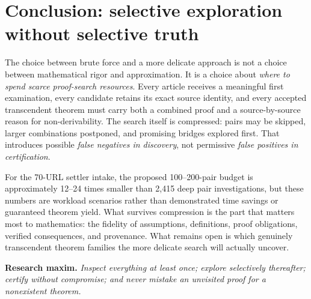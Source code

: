 \documentclass[11pt,letterpaper]{article}
\begin{document}
\section{Conclusion: selective exploration without selective truth}
The choice between brute force and a more delicate approach is not a choice between mathematical rigor and approximation. It is a choice about \emph{where to spend scarce proof-search resources}. Every article receives a meaningful first examination, every candidate retains its exact source identity, and every accepted transcendent theorem must carry both a combined proof and a source-by-source reason for non-derivability. The search itself is compressed: pairs may be skipped, larger combinations postponed, and promising bridges explored first. That introduces possible \emph{false negatives in discovery}, not permissive \emph{false positives in certification}.

For the 70-URL settler intake, the proposed 100--200-pair budget is approximately 12--24 times smaller than 2,415 deep pair investigations, but these numbers are workload scenarios rather than demonstrated time savings or guaranteed theorem yield. What survives compression is the part that matters most to mathematics: the fidelity of assumptions, definitions, proof obligations, verified consequences, and provenance. What remains open is which genuinely transcendent theorem families the more delicate search will actually uncover.

\vspace{0.4em}
\noindent\colorbox{light}{\parbox{0.955\linewidth}{\small\textbf{Research maxim.} \emph{Inspect everything at least once; explore selectively thereafter; certify without compromise; and never mistake an unvisited proof for a nonexistent theorem.}}}
\end{document}
